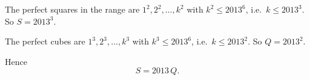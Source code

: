 The perfect squares in the range are $1^2,2^2,\dots,k^2$ with $k^2\le2013^6$, i.e.\ $k\le2013^3$. So $S=2013^3$.

The perfect cubes are $1^3,2^3,\dots,k^3$ with $k^3\le2013^6$, i.e.\ $k\le2013^2$. So $Q=2013^2$.

Hence
\[
\boxed{S=2013\,Q}.
\]
